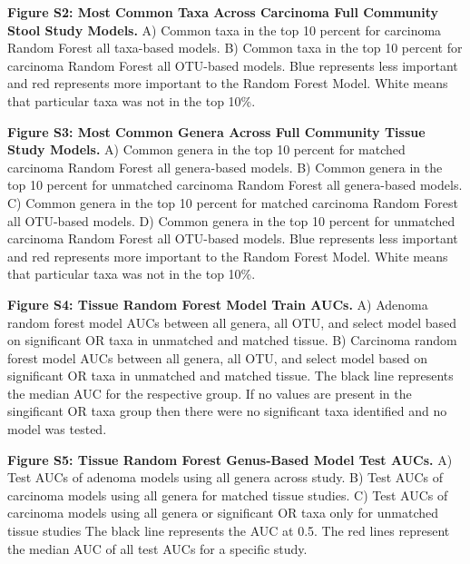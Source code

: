 \documentclass[12pt,]{article}
\begin{document}
\textbf{Figure S2: Most Common Taxa Across Carcinoma Full Community
Stool Study Models.} A) Common taxa in the top 10 percent for carcinoma
Random Forest all taxa-based models. B) Common taxa in the top 10
percent for carcinoma Random Forest all OTU-based models. Blue
represents less important and red represents more important to the
Random Forest Model. White means that particular taxa was not in the top
10\%.

\textbf{Figure S3: Most Common Genera Across Full Community Tissue Study
Models.} A) Common genera in the top 10 percent for matched carcinoma
Random Forest all genera-based models. B) Common genera in the top 10
percent for unmatched carcinoma Random Forest all genera-based models.
C) Common genera in the top 10 percent for matched carcinoma Random
Forest all OTU-based models. D) Common genera in the top 10 percent for
unmatched carcinoma Random Forest all OTU-based models. Blue represents
less important and red represents more important to the Random Forest
Model. White means that particular taxa was not in the top 10\%.

\textbf{Figure S4: Tissue Random Forest Model Train AUCs.} A) Adenoma
random forest model AUCs between all genera, all OTU, and select model
based on significant OR taxa in unmatched and matched tissue. B)
Carcinoma random forest model AUCs between all genera, all OTU, and
select model based on significant OR taxa in unmatched and matched
tissue. The black line represents the median AUC for the respective
group. If no values are present in the singificant OR taxa group then
there were no significant taxa identified and no model was tested.

\textbf{Figure S5: Tissue Random Forest Genus-Based Model Test AUCs.} A)
Test AUCs of adenoma models using all genera across study. B) Test AUCs
of carcinoma models using all genera for matched tissue studies. C) Test
AUCs of carcinoma models using all genera or significant OR taxa only
for unmatched tissue studies The black line represents the AUC at 0.5.
The red lines represent the median AUC of all test AUCs for a specific
study.

\newpage
\end{document}
